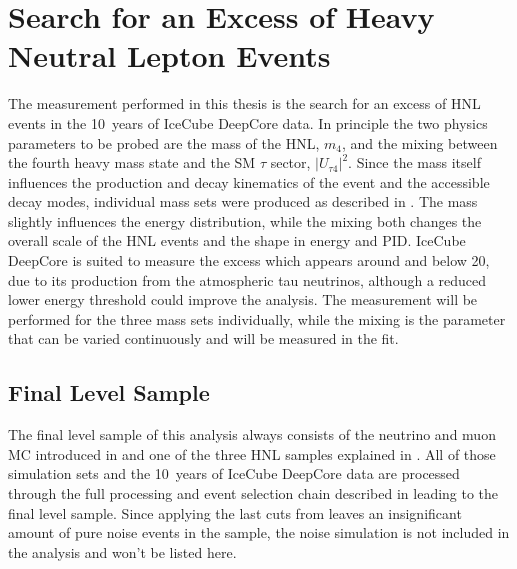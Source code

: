\setchapterpreamble[u]{\margintoc}

\chapter{Search for an Excess of Heavy Neutral Lepton Events}

The measurement performed in this thesis is the search for an excess of HNL events in the \SI{10}{years} of IceCube DeepCore data. In principle the two physics parameters to be probed are the mass of the HNL, $m_4$, and the mixing between the fourth heavy mass state and the SM $\tau$ sector, $|U_{\tau4}|^2$. Since the mass itself influences the production and decay kinematics of the event and the accessible decay modes, individual mass sets were produced as described in . The mass slightly influences the energy distribution, while the mixing both changes the overall scale of the HNL events and the shape in energy and PID. IceCube DeepCore is suited to measure the excess which appears around and below \SI{20}{\gev}, due to its production from the atmospheric tau neutrinos, although a reduced lower energy threshold could improve the analysis. The measurement will be performed for the three mass sets individually, while the mixing is the parameter that can be varied continuously and will be measured in the fit. 


\section{Final Level Sample} 

The final level sample of this analysis always consists of the neutrino and muon MC introduced in  and one of the three HNL samples explained in . All of those simulation sets and the \SI{10}{years} of IceCube DeepCore data are processed through the full processing and event selection chain described in  leading to the final level sample. Since applying the last cuts from  leaves an insignificant amount of pure noise events in the sample, the noise simulation is not included in the analysis and won't be listed here.



